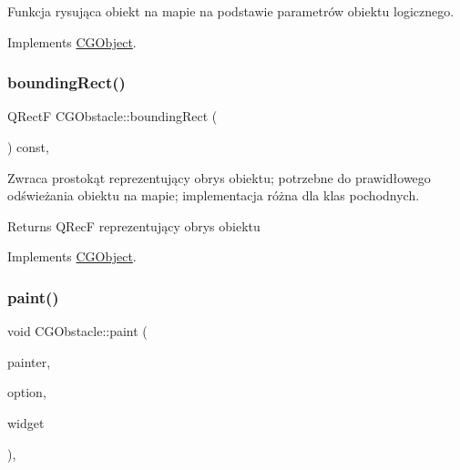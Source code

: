 Funkcja rysująca obiekt na mapie na podstawie parametrów obiektu logicznego. 



Implements \mbox{\hyperlink{class_c_g_object_a859e765fbb3ab0d6ad73ca58e5e49779}{C\+G\+Object}}.

\mbox{\label{class_c_g_obstacle_a88a124737ae6f96c6b07316591ecdb34}} 
\subsubsection{\texorpdfstring{bounding\+Rect()}{boundingRect()}}
{\footnotesize\ttfamily Q\+RectF C\+G\+Obstacle\+::bounding\+Rect (\begin{DoxyParamCaption}{ }\end{DoxyParamCaption}) const\hspace{0.3cm}{\ttfamily [override]}, {\ttfamily [virtual]}}



Zwraca prostokąt reprezentujący obrys obiektu; potrzebne do prawidłowego odświeżania obiektu na mapie; implementacja różna dla klas pochodnych. 

\begin{DoxyReturn}{Returns}
Q\+RecF reprezentujący obrys obiektu 
\end{DoxyReturn}


Implements \mbox{\hyperlink{class_c_g_object_ab9edf3d10a53c254cdb5d3d8de930207}{C\+G\+Object}}.

\mbox{\label{class_c_g_obstacle_a4ae41138f5fa9f7929c71f1999df7793}} 
\subsubsection{\texorpdfstring{paint()}{paint()}}
{\footnotesize\ttfamily void C\+G\+Obstacle\+::paint (\begin{DoxyParamCaption}\item[{Q\+Painter $\ast$}]{painter,  }\item[{const Q\+Style\+Option\+Graphics\+Item $\ast$}]{option,  }\item[{Q\+Widget $\ast$}]{widget }\end{DoxyParamCaption})\hspace{0.3cm}{\ttfamily [override]}, {\ttfamily [virtual]}}



